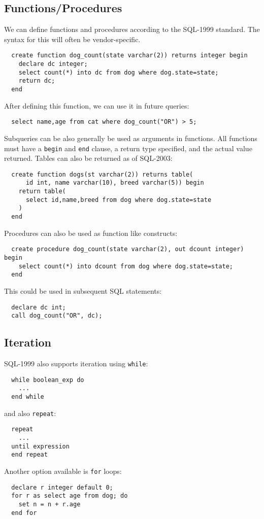 \documentclass{math}
\begin{document}
\subsection*{Functions/Procedures}
We can define functions and procedures according to the SQL-1999 standard.
The syntax for this will often be vendor-specific.
\begin{lstlisting}
  create function dog_count(state varchar(2)) returns integer begin
    declare dc integer;
    select count(*) into dc from dog where dog.state=state;
    return dc;
  end
\end{lstlisting}
After defining this function, we can use it in future queries:
\begin{lstlisting}
  select name,age from cat where dog_count("OR") > 5;
\end{lstlisting}
Subqueries can be also generally be used as arguments in functions. All
functions must have a \texttt{begin} and \texttt{end} clause, a return type
specified, and the actual value returned. Tables can also be returned as of
SQL-2003:
\begin{lstlisting}
  create function dogs(st varchar(2)) returns table(
      id int, name varchar(10), breed varchar(5)) begin
    return table(
      select id,name,breed from dog where dog.state=state
    )
  end
\end{lstlisting}
Procedures can also be used as function like constructs:
\begin{lstlisting}
  create procedure dog_count(state varchar(2), out dcount integer) begin
    select count(*) into dcount from dog where dog.state=state;
  end
\end{lstlisting}
This could be used in subsequent SQL statements:
\begin{lstlisting}
  declare dc int;
  call dog_count("OR", dc);
\end{lstlisting}

\subsection*{Iteration}
SQL-1999 also supports iteration using \texttt{while}:
\begin{lstlisting}
  while boolean_exp do
    ...
  end while
\end{lstlisting}
and also \texttt{repeat}:
\begin{lstlisting}
  repeat
    ...
  until expression
  end repeat
\end{lstlisting}
Another option available is \texttt{for} loops:
\begin{lstlisting}
  declare r integer default 0;
  for r as select age from dog; do
    set n = n + r.age
  end for
\end{lstlisting}
\end{document}
